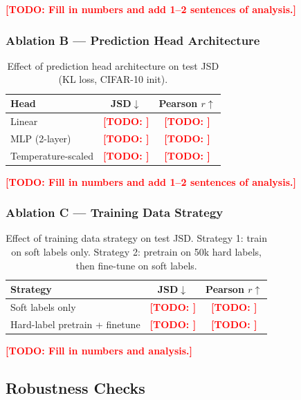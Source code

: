 \documentclass[11pt,a4paper]{article}
\newcommand{\todo}[1]{\textcolor{red}{\textbf{[TODO: #1]}}}
\begin{document}
\todo{Fill in numbers and add 1--2 sentences of analysis.}

\subsubsection{Ablation B — Prediction Head Architecture}

\begin{table}[H]
\centering
\caption{Effect of prediction head architecture on test JSD (KL loss, CIFAR-10 init).}
\label{tab:ablation_head}
\begin{tabular}{lcc}
\toprule
\textbf{Head} & \textbf{JSD}$\downarrow$ & \textbf{Pearson $r$}$\uparrow$ \\
\midrule
Linear              & \todo{} & \todo{} \\
MLP (2-layer)       & \todo{} & \todo{} \\
Temperature-scaled  & \todo{} & \todo{} \\
\bottomrule
\end{tabular}
\end{table}

\todo{Fill in numbers and add 1--2 sentences of analysis.}

\subsubsection{Ablation C — Training Data Strategy}

\begin{table}[H]
\centering
\caption{%
  Effect of training data strategy on test JSD.
  Strategy 1: train on soft labels only.
  Strategy 2: pretrain on 50k hard labels, then fine-tune on soft labels.
}
\label{tab:ablation_data}
\begin{tabular}{lcc}
\toprule
\textbf{Strategy} & \textbf{JSD}$\downarrow$ & \textbf{Pearson $r$}$\uparrow$ \\
\midrule
Soft labels only             & \todo{} & \todo{} \\
Hard-label pretrain + finetune & \todo{} & \todo{} \\
\bottomrule
\end{tabular}
\end{table}

\todo{Fill in numbers and analysis.}

\subsection{Robustness Checks}
\end{document}
